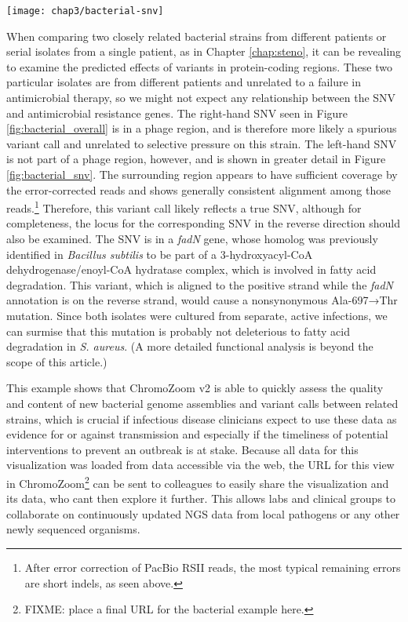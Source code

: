 \begin{figure*}
  \texttt{[image: chap3/bacterial-snv]}               
  \caption[A SNV between the two \emph{S. aureus} strains is in \emph{fadN}]{A SNV between the two \emph{S. aureus} strains is in \emph{fadN}, which putatively encodes a 3-hydroxyacyl-CoA dehydrogenase. Note that \emph{fadN} is on the negative strand while the SNV annotation (top track) is relative to the positive strand.}
  \label{fig:bacterial_snv}
\end{figure*}

When comparing two closely related bacterial strains from different patients or serial isolates from a single patient, as in Chapter \ref{chap:steno}, it can be revealing to examine the predicted effects of variants in protein-coding regions. These two particular isolates are from different patients and unrelated to a failure in antimicrobial therapy, so we might not expect any relationship between the SNV and antimicrobial resistance genes. The right-hand SNV seen in Figure \ref{fig:bacterial_overall} is in a phage region, and is therefore more likely a spurious variant call and unrelated to selective pressure on this strain. The left-hand SNV is not part of a phage region, however, and is shown in greater detail in Figure \ref{fig:bacterial_snv}. The surrounding region appears to have sufficient coverage by the error-corrected reads and shows generally consistent alignment among those reads.\footnote{After error correction of PacBio RSII reads, the most typical remaining errors are short indels, as seen above.} Therefore, this variant call likely reflects a true SNV, although for completeness, the locus for the corresponding SNV in the reverse direction should also be examined. The SNV is in a \emph{fadN} gene, whose homolog was previously identified in \emph{Bacillus subtilis} to be part of a 3-hydroxyacyl-CoA dehydrogenase/enoyl-CoA hydratase complex, which is involved in fatty acid degradation.\autocite{Matsuoka2007} This variant, which is aligned to the positive strand while the \emph{fadN} annotation is on the reverse strand, would cause a nonsynonymous Ala-697→Thr mutation. Since both isolates were cultured from separate, active infections, we can surmise that this mutation is probably not deleterious to fatty acid degradation in \emph{S. aureus}. (A more detailed functional analysis is beyond the scope of this article.)

This example shows that ChromoZoom v2 is able to quickly assess the quality and content of new bacterial genome assemblies and variant calls between related strains, which is crucial if infectious disease clinicians expect to use these data as evidence for or against transmission and especially if the timeliness of potential interventions to prevent an outbreak is at stake. Because all data for this visualization was loaded from data accessible via the web, the URL for this view in ChromoZoom\footnote{FIXME: place a final URL for the bacterial example here.} can be sent to colleagues to easily share the visualization and its data, who cant then explore it further. This allows labs and clinical groups to collaborate on continuously updated NGS data from local pathogens or any other newly sequenced organisms.

